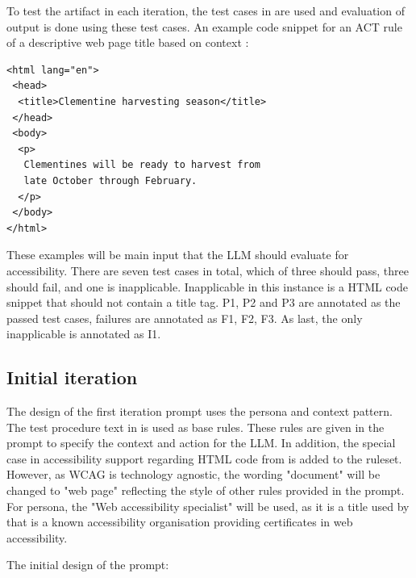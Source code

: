 To test the artifact in each iteration, the test cases in \textcite{act_rule_g88} are used and evaluation of output is done using these test cases. An example code snippet for an ACT rule of a descriptive web page title based on context \citep{act_rule_g88}:

\begin{verbatim}
<html lang="en">
 <head>
  <title>Clementine harvesting season</title>
 </head>
 <body>
  <p>
   Clementines will be ready to harvest from 
   late October through February.
  </p>
 </body>
</html>
\end{verbatim}

These examples will be main input that the LLM should evaluate for accessibility. There are seven test cases in total, which of three should pass, three should fail, and one is inapplicable. Inapplicable in this instance is a HTML code snippet that should not contain a title tag. P1, P2 and P3 are annotated as the passed test cases, failures are annotated as F1, F2, F3. As last, the only inapplicable is annotated as I1.

\subsection{Initial iteration}

The design of the first iteration prompt uses the persona and context pattern. The test procedure text in \textcite{g88} is used as base rules. These rules are given in the prompt to specify the context and action for the LLM. In addition, the special case in accessibility support regarding HTML code from \textcite{act_rule_g88} is added to the ruleset. However, as WCAG is technology agnostic, the wording "document" will be changed to "web page" reflecting the style of other rules provided in the prompt. For persona, the "Web accessibility specialist" will be used, as it is a title used by \textcite{web_accessibility_specialist} that is a known accessibility organisation providing certificates in web accessibility.

The initial design of the prompt:

